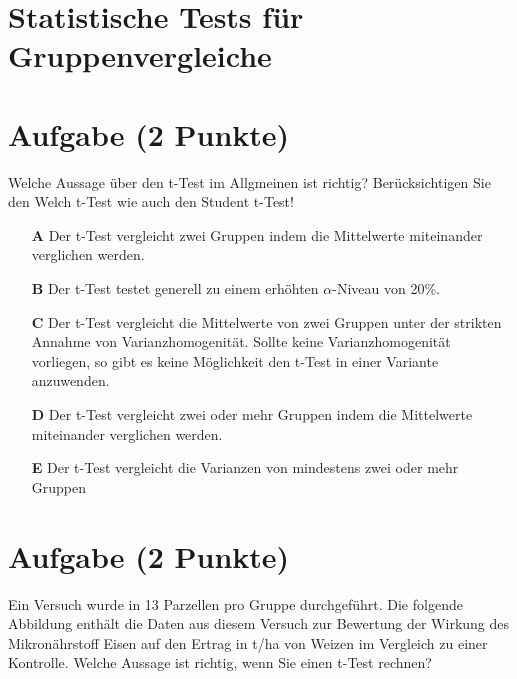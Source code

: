 \documentclass[a4paper, 9pt]{scrartcl}\usepackage[]{graphicx}\usepackage[]{xcolor}
\begin{document}
\section*{Statistische Tests für Gruppenvergleiche} 

\section{Aufgabe \hfill (2 Punkte)}



Welche Aussage über den t-Test im Allgmeinen ist richtig? Berücksichtigen Sie den Welch t-Test wie auch den Student t-Test!



\begin{enumerate}
\item [\textbf{A} \msquare] Der t-Test vergleicht zwei Gruppen indem die Mittelwerte miteinander verglichen werden.
\item [\textbf{B} \msquare] Der t-Test testet generell zu einem erhöhten $\alpha$-Niveau von 20\%.
\item [\textbf{C} \msquare] Der t-Test vergleicht die Mittelwerte von zwei Gruppen unter der strikten Annahme von Varianzhomogenität. Sollte keine Varianzhomogenität vorliegen, so gibt es keine Möglichkeit den t-Test in einer Variante anzuwenden.
\item [\textbf{D} \msquare] Der t-Test vergleicht zwei oder mehr Gruppen indem die Mittelwerte miteinander verglichen werden.
\item [\textbf{E} \msquare] Der t-Test vergleicht die Varianzen von mindestens zwei oder mehr Gruppen
\end{enumerate}

\section{Aufgabe \hfill (2 Punkte)}



Ein Versuch wurde in 13 Parzellen pro Gruppe durchgeführt. Die folgende Abbildung enthält die Daten aus diesem Versuch zur Bewertung der Wirkung des Mikronährstoff Eisen auf den Ertrag in t/ha von Weizen im Vergleich zu einer Kontrolle.  Welche Aussage ist richtig, wenn Sie einen t-Test rechnen?
\end{document}
